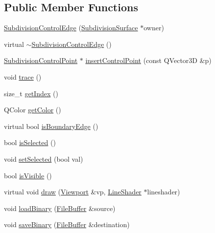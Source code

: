\subsection*{Public Member Functions}
\begin{DoxyCompactItemize}
\item 
\hyperlink{classShipCAD_1_1SubdivisionControlEdge_aca48edfc1bb45a645708aecc8c8c3e04}{Subdivision\-Control\-Edge} (\hyperlink{classShipCAD_1_1SubdivisionSurface}{Subdivision\-Surface} $\ast$owner)
\item 
virtual \hyperlink{classShipCAD_1_1SubdivisionControlEdge_ad5e8153693c900a598618277cdeccd15}{$\sim$\-Subdivision\-Control\-Edge} ()
\item 
\hyperlink{classShipCAD_1_1SubdivisionControlPoint}{Subdivision\-Control\-Point} $\ast$ \hyperlink{classShipCAD_1_1SubdivisionControlEdge_a4839a04d67e4240b570fd23be711bc10}{insert\-Control\-Point} (const Q\-Vector3\-D \&p)
\item 
void \hyperlink{classShipCAD_1_1SubdivisionControlEdge_a07c67ddff486dc5e4ad830f549b32099}{trace} ()
\item 
size\-\_\-t \hyperlink{classShipCAD_1_1SubdivisionControlEdge_a0fb224ed7895deb9eb4cdb57ab9c451c}{get\-Index} ()
\item 
Q\-Color \hyperlink{classShipCAD_1_1SubdivisionControlEdge_a5cafa9a1fd8c93f10e2ae767608dfb26}{get\-Color} ()
\item 
virtual bool \hyperlink{classShipCAD_1_1SubdivisionControlEdge_a23adc8ad28860987b7b4866eada3c463}{is\-Boundary\-Edge} ()
\item 
bool \hyperlink{classShipCAD_1_1SubdivisionControlEdge_abcb240992ffb5637363341dbfd7003c7}{is\-Selected} ()
\item 
void \hyperlink{classShipCAD_1_1SubdivisionControlEdge_ae247e08eec97952d1835df03c8269829}{set\-Selected} (bool val)
\item 
bool \hyperlink{classShipCAD_1_1SubdivisionControlEdge_aaf83103b6772bf2387641b09194b12a6}{is\-Visible} ()
\item 
virtual void \hyperlink{classShipCAD_1_1SubdivisionControlEdge_a6b86017a5ea7fe487f6017071406e8c4}{draw} (\hyperlink{classShipCAD_1_1Viewport}{Viewport} \&vp, \hyperlink{classShipCAD_1_1LineShader}{Line\-Shader} $\ast$lineshader)
\item 
void \hyperlink{classShipCAD_1_1SubdivisionControlEdge_a0f48c4ce176a5de42e0a7c741aa129f5}{load\-Binary} (\hyperlink{classShipCAD_1_1FileBuffer}{File\-Buffer} \&source)
\item 
void \hyperlink{classShipCAD_1_1SubdivisionControlEdge_a572f4331ef0ab6f241583fc8d36cb93e}{save\-Binary} (\hyperlink{classShipCAD_1_1FileBuffer}{File\-Buffer} \&destination)

\end{DoxyCompactItemize}

